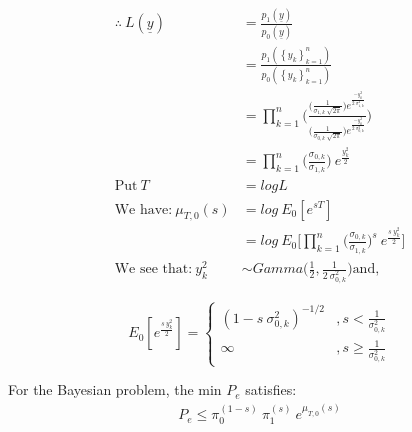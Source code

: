 \documentclass[12pt]{report}
\begin{document}
\begin{exmp}
           \begin{align}
                 \therefore \: L( \underline{y}) &=  \frac{ p_1(\underline{y})}{ p_0(\underline{y})} \nonumber \\
                                          &=   \frac{  p_1(\left\{y_k\right\}^{n}_{k=1})  }  { p_0(\left\{y_k\right\}^{n}_{k=1})  } \nonumber \\
                                          &=  \prod_{k=1}^{n} \Bigg(       \frac{  \Big(\frac{1}{\sigma_{1,k} \: \sqrt{2\pi}}\Big) e^{   \frac{-y_k^{2}}{2 \: \sigma_{1,k}^{2} }   }  } {  \Big(\frac{1}{\sigma_{0,k}\: \sqrt{2\pi}}\Big) e^{   \frac{-y_k^{2}}{2 \: \sigma_{0,k}^{2}}   }   } \Bigg) \nonumber \\
                                          &=   \prod_{k=1}^{n}  \Big( \frac{\sigma_{0,k}}{\sigma_{1,k}} \Big) \: e^{  \frac{y_k^{2}}{2}  }   \\
                       \text{Put} \: T &= log L \nonumber \\
                       \text{We have:} \: \mu_{T,0}(s) &= log \: E_0[e^{sT}] \nonumber  \\
                                                                            &= log \: E_0\Big[  \prod_{k=1}^{n}   \Big(\frac{\sigma_{0,k}}{\sigma_{1,k}} \Big)^{s} \: e^{\frac{s\:y_k^{2}}{2}  }   \Big]\\
                      \text{We see that:} \: y_k^{2} &\sim Gamma\Big (\frac{1}{2}, \frac{1}{2 \: \sigma_{0,k}^2} \Big ) \text{and,}
           \end{align}



             \begin{equation}
                     E_0[e^{\frac{s\:y_k^{2}}{2}}] = 
                \begin{cases}
                         (1 - s \: \sigma_{0,k}^2)^{-1/2}&,  s< \frac{1}{\sigma_{0,k}^2}\\
                         \infty&,  s\geq \frac{1}{\sigma_{0,k}^2}
               \end{cases}
            \end{equation}


\noindent  For the Bayesian problem, the min $P_e$ satisfies:
                     \begin{align}
                         P_e \leq \pi_0^{(1-s)} \: \pi_1^{(s)} \: e^{ \mu_{T,0}(s)} 
                     \end{align}
                         

\end{exmp}
\end{document}
